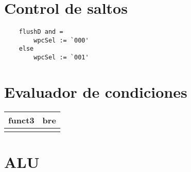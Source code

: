 \documentclass[letterpaper]{article}
\begin{document}
\section{Control de saltos}

\begin{verbatim}
    flushD and =
        wpcSel := `000' 
    else
        wpcSel := `001' 
\end{verbatim}



\section{Evaluador de condiciones}
\begin{tabular}{c| l}
    funct3      & bre \\\hline
    \verb%000%  & $EQ = Z$ \\
    \verb%001%  & $NE = ~Z$ \\
    \verb%100%  & $LT = N \oplus OV$ \\
    \verb%101%  & $GE = ~LT$ \\
    \verb%110%  & $LTU = ~C$ \\
    \verb%111%  & $GEU = C$ \\
    \verb%x%   & \verb%0% \\

\end{tabular}

\section{ALU}
\end{document}
